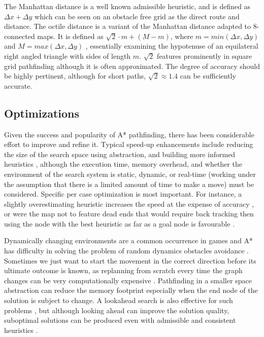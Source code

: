 \documentclass{scrartcl}
\begin{document}
The Manhattan distance is a well known admissible heuristic, and is defined as $\Delta x + \Delta y$ \cite{botea2013pathfinding} which can be seen on an obstacle free grid as the direct route and distance.  The octile distance is a variant of the Manhattan distance adapted to 8-connected maps. It is defined as $\sqrt{2} \cdot m + (M - m)$, where $m = min(\Delta x, \Delta y)$ and $M = max(\Delta x, \Delta y)$ \cite{botea2013pathfinding}, essentially examining the hypotenuse of an equilateral right angled triangle with sides of length $m$.  $\sqrt{2}$ features prominently in square grid pathfinding although it is often approximated.  The degree of accuracy should be highly pertinent, although for short paths, $\sqrt{2} \approx 1.4$ can be sufficiently accurate.

\subsection*{Optimizations}

Given the success and popularity of A* pathfinding, there has been considerable effort to improve and refine it.  Typical speed-up enhancements include reducing the size of the search space using abstraction, and building more informed heuristics \cite{harabor2010breaking}, although the execution time, memory overhead, and whether the environment of the search system is static, dynamic, or real-time \cite{hart1968formal} (working under the assumption that there is a limited amount of time to make a move) must be considered.  Specific per case optimization is most important. For instance, a slightly overestimating heuristic increases the speed at the expense of accuracy \cite{millington2016artificial}, or were the map not to feature dead ends that would require back tracking then using the node with the best heuristic as far as a goal node is favourable \cite{togelius20102009}.

Dynamically changing environments \cite{botea2011ultra} are a common occurrence in games and A* has difficulty in solving the problem of random dynamics obstacles avoidance \cite{wang2012game}.  Sometimes we just want to start the movement in the correct direction before its ultimate outcome is known, as replanning from scratch every time the graph changes can be very computationally expensive \cite{ferguson2005guide}.  Pathfinding in a smaller space abstraction can reduce the memory footprint \cite{lawrence2013database} especially when the end node of the solution is subject to change.  A lookahead search is also effective for such problems \cite{korf1990real}, but although looking ahead can improve the solution quality, suboptimal solutions can be produced even with admissible and consistent heuristics \cite{bulitko2003lookahead}.
\end{document}

